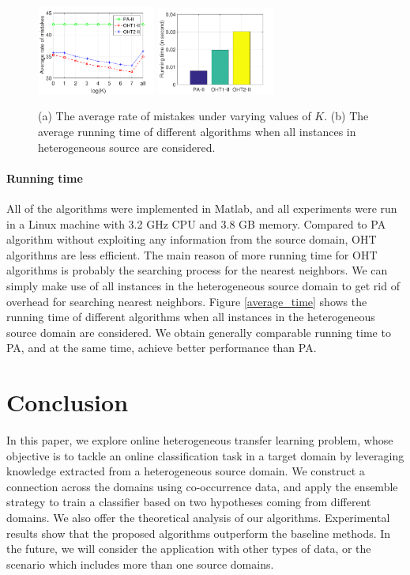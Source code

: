 \documentclass[letterpaper]{article}
\theoremstyle{remark}
\theoremstyle{definition}
\begin{document}
\begin{figure}[!htb]
\centering
  \subfigure
  {
    \label{average_error}
    \includegraphics[width=3.9cm]{average_error.pdf}
  }
  \subfigure
  {
    \label{average_time}
    \includegraphics[width=3.9cm]{average_time.pdf}
  }
  \caption{(a) The average rate of mistakes under varying values of $K$. (b) The average running time of different algorithms when all instances in heterogeneous source are considered.}
  \label{average eok}
\end{figure}

\paragraph{Running time}
All of the algorithms were implemented in Matlab, and all experiments were run in a Linux machine with 3.2 GHz CPU and 3.8 GB memory.
Compared to PA algorithm without exploiting any information from the source domain, OHT algorithms are less efficient.
The main reason of more running time for OHT algorithms is probably the searching process for the nearest neighbors.
We can simply make use of all instances in the heterogeneous source domain to get rid of overhead for searching nearest neighbors.
Figure \ref{average_time} shows the running time of different algorithms when all instances in the heterogeneous source domain are considered.
We obtain generally comparable running time to PA, and at the same time, achieve better performance than PA.

\section{Conclusion}

In this paper, we explore online heterogeneous transfer learning problem, whose objective is to tackle an online classification task in a target domain by leveraging knowledge extracted from a heterogeneous source domain.
We construct a connection across the domains using co-occurrence data, and apply the ensemble strategy to train a classifier based on two hypotheses coming from different domains.
We also offer the theoretical analysis of our algorithms.
Experimental results show that the proposed algorithms outperform the baseline methods.
In the future, we will consider the application with other types of data, or the scenario which includes more than one source domains.



\end{document}
